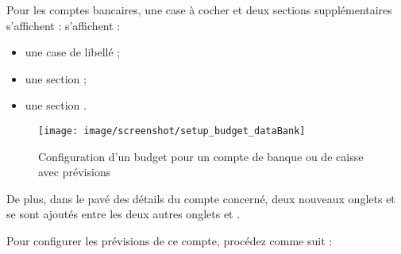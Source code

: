 Pour les comptes bancaires, une case à cocher et deux sections supplémentaires \ifIllustration s'affichent :
\else s'affichent : 
\fi

\begin{itemize}
	\item une case de libellé  ; 
	\item une section  ;
	\item une section .
\end{itemize}

\ifIllustration
\begin{figure}[ht]
\begin{center}
\texttt{[image: image/screenshot/setup\_budget\_dataBank]}
\end{center}
\caption{Configuration d'un budget pour un compte de banque ou de caisse avec prévisions}
\label{setup_budget_dataBank-img}
\end{figure}
\fi

De plus, dans le pavé des détails du compte concerné, deux nouveaux onglets  et  se sont ajoutés entre les deux autres onglets  et .

Pour configurer les prévisions de ce compte, procédez comme suit :

